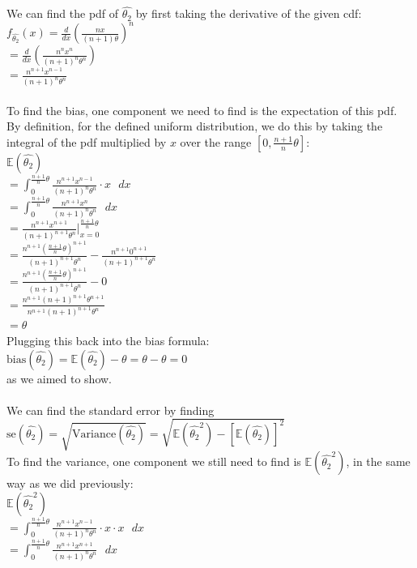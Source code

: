 \documentclass{article}
\begin{document}
{We can find the pdf of $\hat{\theta_2}$ by first taking the derivative of the given cdf: \\ 
$f_{\hat{\theta_2}}(x) = \frac{d}{dx} (\frac{nx}{(n+1)\theta})^n$ \\
$= \frac{d}{dx} (\frac{n^nx^n}{(n+1)^n\theta^n})$ \\
$= \frac{n^{n+1}x^{n-1}}{(n+1)^n\theta^n}$ \\ \\
To find the bias, one component we need to find is the expectation of this pdf. By definition, for the defined uniform distribution, we do this by taking the integral of the pdf multiplied by $x$ over the range $[0, \frac{n+1}{n}\theta]$: \\
$\mathbb{E}(\hat{\theta_2}) $\\
$= \int_{0}^{\frac{n+1}{n}\theta}\frac{n^{n+1}x^{n-1}}{(n+1)^n\theta^n} \cdot x \text{ } dx $ \\
$= \int_{0}^{\frac{n+1}{n}\theta}\frac{n^{n+1}x^n}{(n+1)^n\theta^n} \text{ } dx $ \\ 
$= \frac{n^{n+1}x^{n+1}}{(n+1)^{n+1}\theta^n} |_{x=0}^{\frac{n+1}{n}\theta} $ \\ 
$= \frac{n^{n+1}(\frac{n+1}{n}\theta)^{n+1}}{(n+1)^{n+1}\theta^n} - \frac{n^{n+1}0^{n+1}}{(n+1)^{n+1}\theta^n} $ \\
$= \frac{n^{n+1}(\frac{n+1}{n}\theta)^{n+1}}{(n+1)^{n+1}\theta^n} - 0$ \\ 
$= \frac{n^{n+1}(n+1)^{n+1}\theta^{n+1}}{n^{n+1}(n+1)^{n+1}\theta^n}$ \\ 
$= \theta$ \\ 
Plugging this back into the bias formula: \\
$\text{bias}(\hat{\theta_2}) = \mathbb{E}(\hat{\theta_2}) - \theta = \theta - \theta = 0$ \\ 
as we aimed to show. \\ \\
We can find the standard error by finding $\text{se}(\hat{\theta_2}) = \sqrt{\text{Variance}(\hat{\theta_2})} = \sqrt{\mathbb{E}(\hat{\theta_2}^2) - [\mathbb{E}(\hat{\theta_2})]^2}$ \\
To find the variance, one component we still need to find is $\mathbb{E}(\hat{\theta_2}^2)$, in the same way as we did previously: \\
$\mathbb{E}(\hat{\theta_2}^2)$ \\
$= \int_{0}^{\frac{n+1}{n}\theta}\frac{n^{n+1}x^{n-1}}{(n+1)^n\theta^n} \cdot x \cdot x \text{ } dx $ \\
$= \int_{0}^{\frac{n+1}{n}\theta}\frac{n^{n+1}x^{n+1}}{(n+1)^n\theta^n} \text{ } dx $ \\
}
\end{document}
